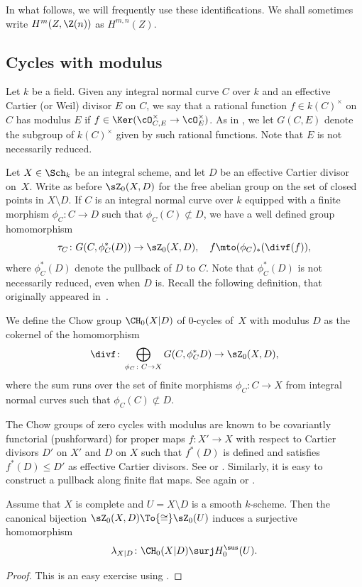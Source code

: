 In what follows, we will frequently use these identifications.
We shall sometimes write $H^m(Z, \Z(n))$ as $H^{m,n}(Z)$.

\subsection{Cycles with modulus}
Let $k$ be a field. Given any integral normal curve $C$ over $k$ and an effective Cartier (or Weil) divisor $E$ on $C$, we say that a rational function $f\in k(C)^\times$ on $C$ has modulus $E$ if $f\in \Ker(\cO_{C, E}^\times \to \cO_E^\times)$. As in , we let $G(C, E)$ denote the subgroup of $k(C)^\times$ given by such rational functions. Note that $E$ is not necessarily reduced.

Let $X\in \Sch_k$ be an integral scheme, and let $D$ be an effective Cartier divisor on~$X$. Write as before $\sZ_0(X, D)$ for the free abelian group on the set of closed points in $X \setminus D$. If $C$ is an integral normal curve over $k$ equipped with a finite morphism $\phi_C\colon C\to D$ such that $\phi_C(C)\not\subset D$, we have a well defined group homomorphism
\[\tau_C\colon G(C, \phi_C^*(D)) \to \sZ_0(X,D), \quad f\mto (\phi_C)_*(\divf(f)),\]
where $\phi_C^*(D)$ denote the pullback of $D$ to $C$. Note that $\phi_C^*(D)$ is not necessarily reduced, even when $D$ is. Recall the following definition, that originally appeared in~\cite{KS}.

\begin{defn} We define the Chow group $\CH_0(X|D)$ of $0$-cycles of~$X$ with modulus $D$ as the cokernel of the homomorphism
\[\divf\colon \bigoplus_{\phi_C\colon C\to X}G(C, \phi_C^*D)\to \sZ_0(X,D),\]
where the sum runs over the set of finite morphisms $\phi_C\colon C\to X$ from integral normal curves such that $\phi_C(C)\not\subset D$.
\end{defn}

The Chow groups of zero cycles with modulus are known to be covariantly functorial (pushforward) for proper maps $f\colon X'\to X$ with respect to Cartier divisors $D'$ on $X'$ and $D$ on $X$ such that $f^*(D)$ is defined and satisfies $f^*(D) \leq D'$ as effective Cartier divisors. See \cite[Lem.\,2.4]{BS} or
\cite[Prop.\,2.10]{KPv}. Similarly, it is easy to construct a pullback along finite flat maps. See again \cite[Lem.\,2.4]{BS} or \cite[Prop.\,2.12]{KPv}.

\begin{lem}\label{lem:mod-Suslin} Assume that $X$ is complete and
$U=X \setminus D$ is a smooth $k$-scheme. Then the canonical bijection
$\sZ_0(X,D) \To{\cong} \sZ_0(U)$ induces a surjective homomorphism
\begin{equation}\label{eqn:mod-Suslin}\lambda_{X|D}\colon
\CH_0(X|D)\surj H_0^{\sus}(U).\end{equation}
\end{lem}
\begin{proof}
This is an easy exercise using .
\end{proof}

